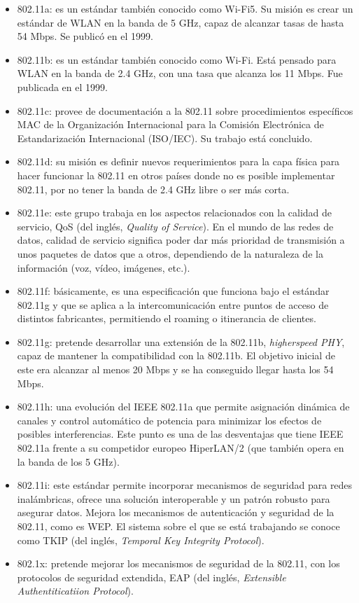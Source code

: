  \begin{itemize}
\item 802.11a: es un estándar también conocido como Wi-Fi5. Su misión es crear un estándar de WLAN en la banda de 5 GHz, capaz de alcanzar tasas de hasta 54 Mbps. Se publicó en el 1999.
\item  802.11b: es un estándar también conocido como Wi-Fi. Está pensado para WLAN en la banda de 2.4 GHz, con una tasa que alcanza los 11 Mbps. Fue publicada en el 1999.
\item  802.11c: provee de documentación a la 802.11 sobre procedimientos específicos MAC de la Organización Internacional para la Comisión Electrónica de Estandarización Internacional (ISO/IEC). Su trabajo está concluido.
\item  802.11d: su misión es definir nuevos requerimientos para la capa física para hacer funcionar la 802.11 en otros países donde no es posible implementar 802.11, por no tener la banda de 2.4 GHz libre o ser más corta.
\item  802.11e: este grupo trabaja en los aspectos relacionados con la calidad de servicio, QoS (del inglés, \textit{Quality of Service}). En el mundo de las redes de datos, calidad de servicio significa poder dar más prioridad de transmisión a unos paquetes de datos que a otros, dependiendo de la naturaleza de la información (voz, vídeo, imágenes, etc.).
\item  802.11f: básicamente, es una especificación que funciona bajo el estándar 802.11g y que se aplica a la intercomunicación entre puntos de acceso de distintos fabricantes, permitiendo el roaming o itinerancia de clientes.
\item  802.11g: pretende desarrollar una extensión de la 802.11b, \textit{higherspeed PHY}, capaz de mantener la compatibilidad con la 802.11b. El objetivo inicial de este era alcanzar al menos 20 Mbps y se ha conseguido llegar hasta los 54 Mbps.
\item  802.11h: una evolución del IEEE 802.11a que permite asignación dinámica de canales y control automático de potencia para minimizar los efectos de posibles interferencias. Este punto es una de las desventajas que tiene IEEE 802.11a frente a su competidor europeo HiperLAN/2 (que también opera en la banda de los 5 GHz).
\item 802.11i: este estándar permite incorporar mecanismos de seguridad para redes inalámbricas, ofrece una solución interoperable y un patrón robusto para asegurar datos. Mejora los mecanismos de autenticación y seguridad de la 802.11, como es WEP. El sistema sobre el que se está trabajando se conoce como TKIP (del inglés, \textit{Temporal Key Integrity Protocol}).
\item 802.1x: pretende mejorar los mecanismos de seguridad de la 802.11, con los protocolos de seguridad extendida, EAP (del inglés, \textit{Extensible Authentiticatiion Protocol}).
\end{itemize}

